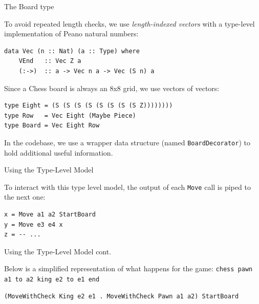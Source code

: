\documentclass{beamer}
\newcommand{\inline}[1]{\lstinline[basicstyle=\ttfamily]{#1}}
\begin{document}
\begin{frame}[fragile]{The Board type}

To avoid repeated length checks, we use \emph{length-indexed vectors} with a type-level implementation of Peano natural numbers:

\begin{lstlisting}
data Vec (n :: Nat) (a :: Type) where
    VEnd   :: Vec Z a
    (:->)  :: a -> Vec n a -> Vec (S n) a
\end{lstlisting}

Since a Chess board is always an 8x8 grid, we use vectors of vectors:

\begin{lstlisting}
type Eight = (S (S (S (S (S (S (S (S Z))))))))
type Row   = Vec Eight (Maybe Piece)
type Board = Vec Eight Row
\end{lstlisting}

In the codebase, we use a wrapper data structure (named \inline{BoardDecorator}) to hold additional useful information.

\end{frame}

\begin{frame}[fragile]{Using the Type-Level Model}

To interact with this type level model, the output of each \inline{Move} call is piped to the next one:

\begin{lstlisting}
x = Move a1 a2 StartBoard
y = Move e3 e4 x
z = -- ...
\end{lstlisting}

\end{frame}

\begin{frame}[fragile]{Using the Type-Level Model cont.}

Below is a simplified representation of what happens for the game: \inline{chess pawn a1 to a2 king e2 to e1 end}

\begin{lstlisting}
(MoveWithCheck King e2 e1 . MoveWithCheck Pawn a1 a2) StartBoard
\end{lstlisting}

\end{frame}


\end{document}
